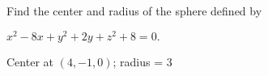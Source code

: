 {Find the center and radius of the sphere defined by

$x^2-8x+y^2+2y+z^2+8=0.$
}
{Center at $(4,-1,0)$; radius = 3
}
